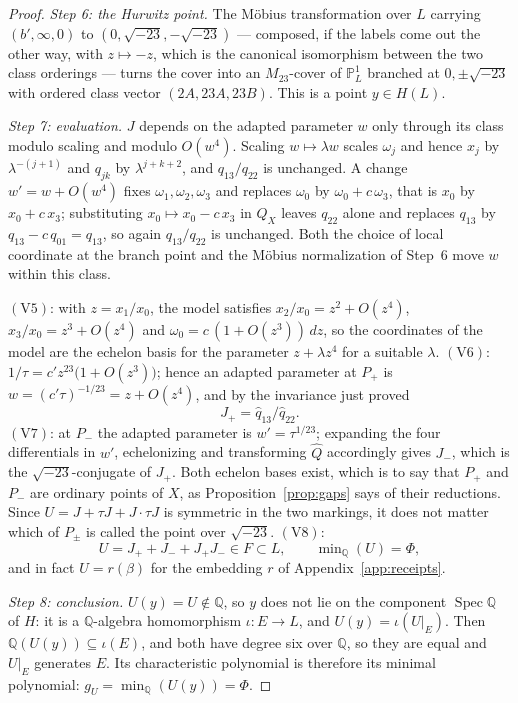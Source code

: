 \documentclass[11pt]{amsart}
\newcommand{\QQ}{\mathbb{Q}}
\newcommand{\PP}{\mathbb{P}}
\newcommand{\Mtw}{M_{23}}
\newcommand{\sqm}{\sqrt{-23}}
\newcommand{\Spec}{\operatorname{Spec}}
\newcommand{\gU}{g_U}
\theoremstyle{plain}
\theoremstyle{definition}
\begin{document}
\begin{proof}
\emph{Step 6: the Hurwitz point.} The M\"obius transformation over $L$
carrying $(b',\infty,0)$ to $(0,\sqm,-\sqm)$ --- composed, if the
labels come out the other way, with $z\mapsto-z$, which is the
canonical isomorphism between the two class orderings --- turns the
cover into an $\Mtw$-cover of $\PP^1_L$ branched at $0,\pm\sqm$ with
ordered class vector $(2A,23A,23B)$. This is a point $y\in H(L)$.

\emph{Step 7: evaluation.} $J$ depends on the adapted parameter $w$
only through its class modulo scaling and modulo $O(w^4)$. Scaling
$w\mapsto\lambda w$ scales $\omega_j$ and hence $x_j$ by
$\lambda^{-(j+1)}$ and $q_{jk}$ by $\lambda^{j+k+2}$, and
$q_{13}/q_{22}$ is unchanged. A change $w'=w+O(w^4)$ fixes
$\omega_1,\omega_2,\omega_3$ and replaces $\omega_0$ by
$\omega_0+c\,\omega_3$, that is $x_0$ by $x_0+c\,x_3$; substituting
$x_0\mapsto x_0-c\,x_3$ in $Q_X$ leaves $q_{22}$ alone and replaces
$q_{13}$ by $q_{13}-c\,q_{01}=q_{13}$, so again $q_{13}/q_{22}$ is
unchanged. Both the choice of local coordinate at the branch point and
the M\"obius normalization of Step~6 move $w$ within this class.

$(\mathrm V5)$: with $z=x_1/x_0$, the model satisfies
$x_2/x_0=z^2+O(z^4)$, $x_3/x_0=z^3+O(z^4)$ and
$\omega_0=c\,(1+O(z^3))\,dz$, so the coordinates of the model are the
echelon basis for the parameter $z+\lambda z^4$ for a suitable
$\lambda$. $(\mathrm V6)$: $1/\tau=c'z^{23}\bigl(1+O(z^3)\bigr)$;
hence an adapted parameter at $P_+$ is $w=(c'\tau)^{-1/23}=z+O(z^4)$,
and by the invariance just proved
\[
  J_+=\hat q_{13}/\hat q_{22}.
\]
$(\mathrm V7)$: at $P_-$ the adapted parameter is $w'=\tau^{1/23}$;
expanding the four differentials in $w'$, echelonizing and
transforming $\hat Q$ accordingly gives $J_-$, which is the
$\sqm$-conjugate of $J_+$. Both echelon bases exist, which is to say
that $P_+$ and $P_-$ are ordinary points of $X$, as
Proposition~\ref{prop:gaps} says of their reductions. Since
$U=J+\tau J+J\cdot\tau J$ is symmetric in the two markings, it does
not matter which of $P_\pm$ is called the point over $\sqm$.
$(\mathrm V8)$:
\[
  U=J_++J_-+J_+J_-\in F\subset L,\qquad
  \min\nolimits_\QQ(U)=\Phi ,
\]
and in fact $U=r(\beta)$ for the embedding $r$ of
Appendix~\ref{app:receipts}.

\emph{Step 8: conclusion.} $U(y)=U\notin\QQ$, so $y$ does not lie on
the component $\Spec\QQ$ of $H$: it is a $\QQ$-algebra homomorphism
$\iota\colon E\to L$, and $U(y)=\iota(U|_E)$. Then
$\QQ(U(y))\subseteq\iota(E)$, and both have degree six over $\QQ$, so
they are equal and $U|_E$ generates $E$. Its characteristic polynomial
is therefore its minimal polynomial: $\gU=\min_\QQ(U(y))=\Phi$.
\end{proof}
\end{document}
